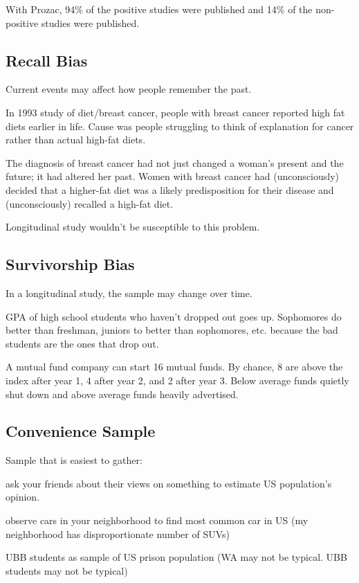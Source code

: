 \documentclass[landscape]{exam}
\begin{document}
  With Prozac, 94\% of the positive studies were published and 14\% of the
  non-positive studies were published.

  \subsection{Recall Bias}
  Current events may affect how people remember the past.  

  In 1993 study of diet/breast cancer, people with breast cancer reported high
  fat diets earlier in life.  Cause was people struggling to think of
  explanation for cancer rather than actual high-fat diets.

  \begin{em}
    The diagnosis of breast cancer had not just changed a woman’s present and the
    future; it had altered her past. Women with breast cancer had (unconsciously)
    decided that a higher-fat diet was a likely predisposition for their disease
    and (unconsciously) recalled a high-fat diet.
  \end{em}

  Longitudinal study wouldn't be susceptible to this problem.

  \subsection{Survivorship Bias}
  In a longitudinal study, the sample may change over time.

  GPA of high school students who haven't dropped out goes up.  Sophomores do
  better than freshman, juniors to better than sophomores, etc. because the bad
  students are the ones that drop out.

  A mutual fund company can start 16 mutual funds.  By chance, 8 are above
  the index after year 1, 4 after year 2, and 2 after year 3.  Below average
  funds quietly shut down and above average funds heavily advertised.

  \subsection{Convenience Sample}
  Sample that is easiest to gather:

  \begin{itemize*}
    \item ask your friends about their views on something to estimate US population's opinion.
    \item observe cars in your neighborhood to find most common car in US (my
      neighborhood has disproportionate number of SUVs)
    \item UBB students as sample of US prison population (WA may not be typical.
      UBB students may not be typical)
  \end{itemize*}
\end{document}
